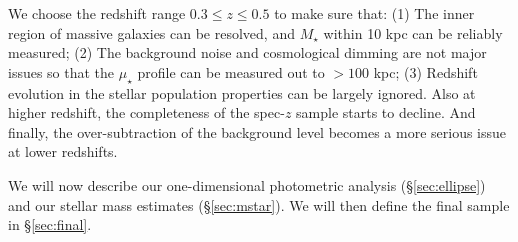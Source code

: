 \documentclass[a4paper,fleqn,usenatbib]{mnras}
\def\msun{$M_\odot$}
\def\mstar{{$M_{\star}$}}
\def\logms{{$\log (M_{\star}/M_{\odot})$}}
\def\mden{{$\mu_{\star}$}}
\begin{document}
    We choose the redshift range $0.3 \leq z \leq 0.5$ to make sure that: 
    (1) The inner region of massive galaxies can be resolved, and \mstar{} within 
    10 kpc can be reliably measured; 
    (2) The background noise and cosmological dimming are not major issues so that the 
    \mden{} profile can be measured out to $>100$ kpc; 
    (3) Redshift evolution in the stellar population properties can be largely 
    ignored.  
    Also at higher redshift, the completeness of the spec-$z$ sample starts to decline. 
    And finally, the over-subtraction of the background level becomes a more serious 
    issue at lower redshifts.  
   
    We will now describe our one-dimensional photometric analysis (\S \ref{sec:ellipse}) 
    and our stellar mass estimates (\S \ref{sec:mstar}). 
    We will then define the final sample in \S \ref{sec:final}.
    
\end{document}

